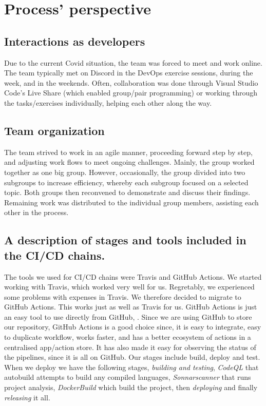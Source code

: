 \section{Process' perspective}

\subsection{Interactions as developers}
Due to the current Covid situation, the team was forced to meet and work online. 
The team typically met on Discord in the DevOps exercise sessions, during the week, and in the weekends. 
Often, collaboration was done through Visual Studio Code's Live Share (which enabled group/pair programming) 
or working through the tasks/exercises individually, helping each other along the way. 
\newline
 
\subsection{Team organization}
The team strived to work in an agile manner, proceeding forward step by step, and adjusting work flows to meet ongoing challenges. 
Mainly, the group worked together as one big group. 
However, occasionally, the group divided into two subgroups to increase efficiency, whereby each subgroup focused on a selected topic. 
Both groups then reconvened to demonstrate and discuss their findings. 
Remaining work was distributed to the individual group members, assisting each other in the process.
  
\subsection{A description of stages and tools included in the CI/CD chains.}%
The tools we used for CI/CD chains were Travis and GitHub Actions. 
We started working with Travis, which worked very well for us. 
Regretably, we experienced some problems with expenses in Travis.
We therefore decided to migrate to GitHub Actions.
This works just as well as Travis for us. 
GitHub Actions is just an easy tool to use directly from GitHub, . 
Since we are using GitHub to store our repository, GitHub Actions is a good choice since, it is easy to 
integrate, easy to duplicate workflow, works faster, and has a better ecosystem of actions in a centralised app/action store. 
It has also made it easy for observing the status of the pipelines, since it is all on GitHub. 
Our stages include build, deploy and test. When we deploy we have the following stages, \textit{building and testing}, \textit{CodeQL} that autobuild attempts to build any compiled languages, \textit{Sonnarscanner} that runs project analysis, \textit{DockerBuild} which build the project, then \textit{deploying} and finally \textit{releasing} it all.\newline

